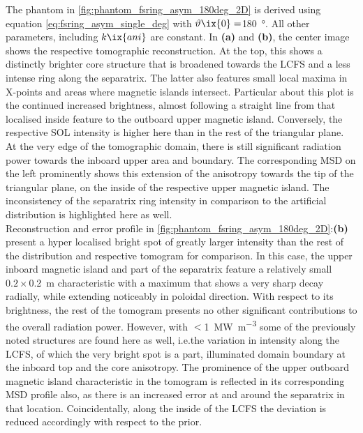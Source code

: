                The phantom in \cref{fig:phantom_fsring_asym_180deg_2D} is derived using equation \ref{eq:fsring_asym_single_deg} with $\vartheta\ix{0}=$\SI{180}{\degree}. All other parameters, including $k\ix{ani}$ are constant. In \textbf{(a)} and \textbf{(b)}, the center image shows the respective tomographic reconstruction. At the top, this shows a distinctly brighter core structure that is broadened towards the LCFS and a less intense ring along the separatrix. The latter also features small local maxima in X-points and areas where magnetic islands intersect. Particular about this plot is the continued increased brightness, almost following a straight line from that localised inside feature to the outboard upper magnetic island. Conversely, the respective SOL intensity is higher here than in the rest of the triangular plane. At the very edge of the tomographic domain, there is still significant radiation power towards the inboard upper area and boundary. The corresponding MSD on the left prominently shows this extension of the anisotropy towards the tip of the triangular plane, on the inside of the respective upper magnetic island. The inconsistency of the separatrix ring intensity in comparison to the artificial distribution is highlighted here as well.\\%
                Reconstruction and error profile in \cref{fig:phantom_fsring_asym_180deg_2D}:\textbf{(b)} present a hyper localised bright spot of greatly larger intensity than the rest of the distribution and respective tomogram for comparison. In this case, the upper inboard magnetic island and part of the separatrix feature a relatively small $0.2\times$\SI{0.2}{\meter} characteristic with a maximum that shows a very sharp decay radially, while extending noticeably in poloidal direction. With respect to its brightness, the rest of the tomogram presents no other significant contributions to the overall radiation power. However, with $<$\SI{1}{\mega\watt\per\cubic\meter} some of the previously noted structures are found here as well, i.e.the variation in intensity along the LCFS, of which the very bright spot is a part, illuminated domain boundary at the inboard top and the core anisotropy. The prominence of the upper outboard magnetic island characteristic in the tomogram is reflected in its corresponding MSD profile also, as there is an increased error at and around the separatrix in that location. Coincidentally, along the inside of the LCFS the deviation is reduced accordingly with respect to the prior.\\%
%
